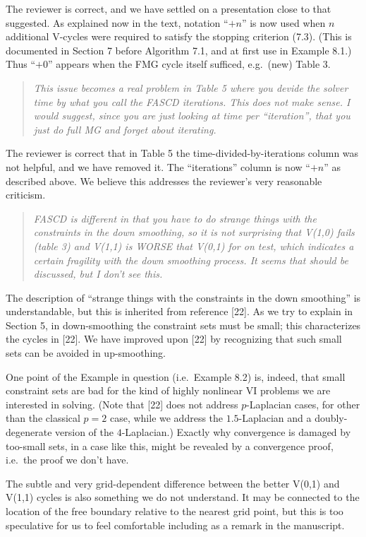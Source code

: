 \documentclass[letterpaper,final,12pt,reqno]{amsart}
\newenvironment{review}%
{\bigskip \par \begin{quote} \selectfont \sl}%
{\end{quote}}
\newcommand\short[1]{\medskip\noindent #1}   %
\newenvironment{response}%
{\medskip\noindent}%
{}
\begin{document}
\short{The reviewer is correct, and we have settled on a presentation close to that suggested.  As explained now in the text, notation ``$+n$'' is now used when $n$ additional V-cycles were required to satisfy the stopping criterion (7.3).  (This is documented in Section 7 before Algorithm 7.1, and at first use in Example 8.1.)  Thus ``$+0$'' appears when the FMG cycle itself sufficed, e.g.~(new) Table 3. }


\begin{review}
This issue becomes a real problem in Table 5 where you devide the solver time by what you call the FASCD iterations.  This does not make sense. I would suggest, since you are just looking at time per ``iteration'', that you just do full MG and forget about iterating.
\end{review}

\short{The reviewer is correct that in Table 5 the time-divided-by-iterations column was not helpful, and we have removed it.  The ``iterations'' column is now ``$+n$'' as described above.  We believe this addresses the reviewer's very reasonable criticism.}

\begin{review}
FASCD is different in that you have to do strange things with the constraints in the down smoothing, so it is not surprising that V(1,0) fails (table 3) and V(1,1) is WORSE that V(0,1) for on test, which indicates a certain fragility with the down smoothing process. It seems that should be discussed, but I don't see this.
\end{review}

\begin{response}
The description of ``strange things with the constraints in the down smoothing'' is understandable, but this is inherited from reference [22].  As we try to explain in Section 5, in down-smoothing the constraint sets must be small; this characterizes the cycles in [22].  We have improved upon [22] by recognizing that such small sets can be avoided in up-smoothing.

One point of the Example in question (i.e.~Example 8.2) is, indeed, that small constraint sets are bad for the kind of highly nonlinear VI problems we are interested in solving.  (Note that [22] does not address $p$-Laplacian cases, for other than the classical $p=2$ case, while we address the $1.5$-Laplacian and a doubly-degenerate version of the $4$-Laplacian.)  Exactly why convergence is damaged by too-small sets, in a case like this, might be revealed by a convergence proof, i.e.~the proof we don't have.

The subtle and very grid-dependent difference between the better V(0,1) and V(1,1) cycles is also something we do not understand.  It may be connected to the location of the free boundary relative to the nearest grid point, but this is too speculative for us to feel comfortable including as a remark in the manuscript.
\end{response}
\end{document}
